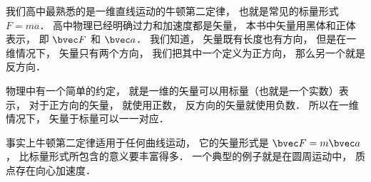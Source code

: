 
我们高中最熟悉的是一维直线运动的牛顿第二定律， 也就是常见的标量形式 $F = ma$． 高中物理已经明确过力和加速度都是矢量， 本书中矢量用黑体和正体表示， 即 $\bvec F$ 和 $\bvec a$． 我们知道， 矢量既有长度也有方向， 但是在一维情况下， 矢量只有两个方向， 我们把其中一个定义为正方向， 那么另一个就是反方向． 

物理中有一个简单的约定， 就是一维的矢量可以用标量（也就是一个实数）表示， 对于正方向的矢量， 就使用正数， 反方向的矢量就使用负数． 所以在一维情况下， 矢量于标量可以一一对应．

事实上牛顿第二定律适用于任何曲线运动， 它的矢量形式是 $\bvec F = m\bvec a$， 比标量形式所包含的意义要丰富得多． 一个典型的例子就是在圆周运动中， 质点存在向心加速度．
